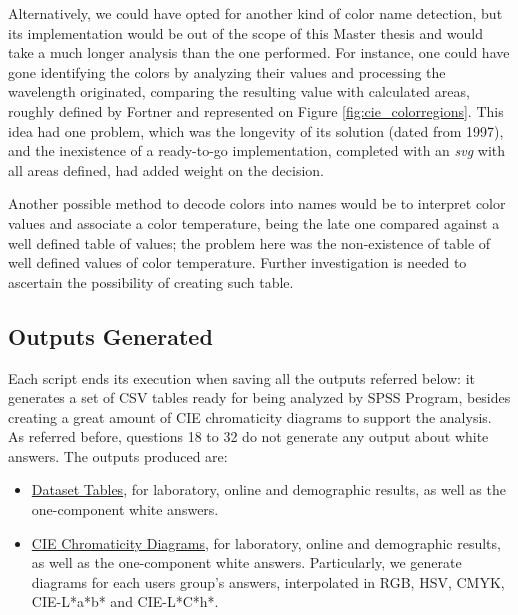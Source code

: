 %
Alternatively, we could have opted for another kind of color name detection, but its implementation would be out of the scope of this Master thesis and would take a much longer
analysis than the one performed. For instance, one could have gone identifying the colors by analyzing their values and processing the wavelength originated, comparing the resulting
value with calculated areas, roughly defined by Fortner \cite{Fortner1997} and represented on Figure \ref{fig:cie_colorregions}. This idea had one problem, which was the longevity
of its solution (dated from 1997), and the inexistence of a ready-to-go implementation, completed with an \emph{svg} with all areas defined, had added weight on the decision. \par
%
Another possible method to decode colors into names would be to interpret color values and associate a color temperature, being the late one compared against a well defined table
of values; the problem here was the non-existence of table of well defined values of color temperature. Further investigation is needed to ascertain the possibility of creating such table.
%
\subsection{Outputs Generated}
\label{subsec:results_outputsgenerated}
%
Each script ends its execution when saving all the outputs referred below: it generates a set of \gls{CSV} tables ready for being analyzed by
SPSS Program, besides creating a great amount of CIE chromaticity diagrams to support the analysis. As referred before, questions 18 to 32 do not generate any output about
white answers. The outputs produced are:
%
\begin{itemize}
  \item \ul{Dataset Tables}, for laboratory, online and demographic results, as well as the one-component white answers.
  \item \ul{CIE Chromaticity Diagrams}, for laboratory, online and demographic results, as well as the one-component white answers. Particularly,
  we generate diagrams for each users group's answers, interpolated in RGB, HSV, CMYK, CIE-L*a*b* and CIE-L*C*h*.
\end{itemize}
%
%

